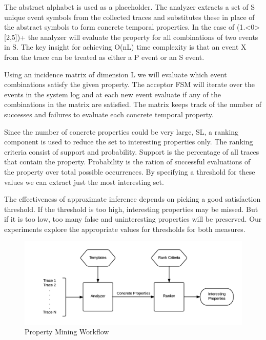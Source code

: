 \documentclass[]{sigplanconf}
\begin{document}
The abstract alphabet is used as a placeholder. The analyzer extracts a set of S unique event symbols from the collected traces and substitutes these in place of the abstract symbols to form concrete temporal properties. In the case of (1.\textless0\textgreater[2,5])+ the analyzer will evaluate the property for all combinations of two events in S. The key insight for achieving O(nL) time complexity is that an event X from the trace can be treated as either a P event or an S event.


Using an incidence matrix of dimension L we will evaluate which event combinations satisfy the given property. The acceptor FSM will iterate over the events in the system log and at each new event evaluate if any of the combinations in the matrix are satisfied. The matrix keeps track of the number of successes and failures to evaluate each concrete temporal property. 

Since the number of concrete properties could be very large, SL, a ranking component is used to reduce the set to interesting properties only. The ranking criteria consist of support and probability. Support is the percentage of all traces that contain the property. Probability is the ration of successful evaluations of the property over total possible occurrences. By specifying a threshold for these values we can extract just the most interesting set. 

The effectiveness of approximate inference depends on picking a good satisfaction threshold. If the threshold is too high, interesting properties may be missed. But if it is too low, too many false and uninteresting properties will be preserved. Our experiments explore the appropriate values for thresholds for both measures.

\begin{figure}[h]
  \centering
  \includegraphics[trim = 1cm 0cm 0cm 0cm,clip = true,width=\linewidth]{figures/Workflow.png}
  \caption{Property Mining Workflow}
  \label{fig:work-flow Overview}
\end{figure}
\end{document}
